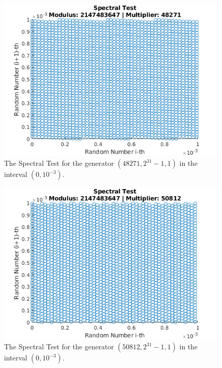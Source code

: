 \begin{figure}
	\includegraphics[width=\columnwidth]{fig/evaluation-randomness-spectral-48271}
	\caption{The Spectral Test for the generator $(48271,2^{31}-1, 1)$ in the interval $(0, 10^{-3})$.}
	\label{fig:evaluation-randomness-spectral-48271}
\end{figure}

\begin{figure}
	\includegraphics[width=\columnwidth]{fig/evaluation-randomness-spectral-50812}
	\caption{The Spectral Test for the generator $(50812,2^{31}-1, 1)$ in the interval $(0, 10^{-3})$.}
	\label{fig:evaluation-randomness-spectral-50812}
\end{figure}

